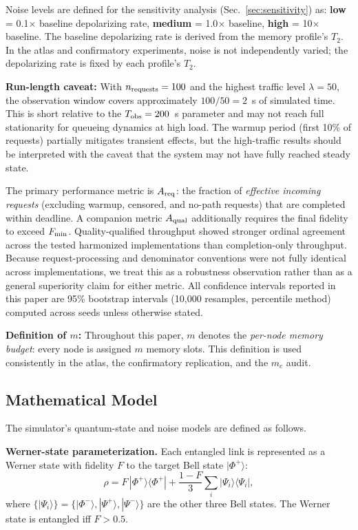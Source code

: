 \documentclass[quantumrep,article,submit,moreauthors]{Definitions/mdpi}
\begin{document}
Noise levels are defined for the sensitivity analysis (Sec.~\ref{sec:sensitivity}) as: \textbf{low} = 0.1$\times$ baseline depolarizing rate, \textbf{medium} = 1.0$\times$ baseline, \textbf{high} = 10$\times$ baseline. The baseline depolarizing rate is derived from the memory profile's $T_2$. In the atlas and confirmatory experiments, noise is not independently varied; the depolarizing rate is fixed by each profile's $T_2$.

\textbf{Run-length caveat:} With $n_{\rm requests} = 100$ and the highest traffic level $\lambda = 50$, the observation window covers approximately $100/50 = 2$~s of simulated time. This is short relative to the $T_{\rm obs} = 200$~s parameter and may not reach full stationarity for queueing dynamics at high load. The warmup period (first 10\% of requests) partially mitigates transient effects, but the high-traffic results should be interpreted with the caveat that the system may not have fully reached steady state.

The primary performance metric is $A_{\rm req}$: the fraction of \textit{effective incoming requests} (excluding warmup, censored, and no-path requests) that are completed within deadline. A companion metric $A_{\rm qual}$ additionally requires the final fidelity to exceed $F_{\rm min}$. Quality-qualified throughput showed stronger ordinal agreement across the tested harmonized implementations than completion-only throughput. Because request-processing and denominator conventions were not fully identical across implementations, we treat this as a robustness observation rather than as a general superiority claim for either metric. All confidence intervals reported in this paper are 95\% bootstrap intervals (10{,}000 resamples, percentile method) computed across seeds unless otherwise stated.

\textbf{Definition of $m$:} Throughout this paper, $m$ denotes the \textit{per-node memory budget}: every node is assigned $m$ memory slots. This definition is used consistently in the atlas, the confirmatory replication, and the $m_c$ audit.

\subsection{Mathematical Model}
\label{sec:math_model}

The simulator's quantum-state and noise models are defined as follows.

\textbf{Werner-state parameterization.} Each entangled link is represented as a Werner state with fidelity $F$ to the target Bell state $|\Phi^+\rangle$:
\begin{equation}
\rho = F\,|\Phi^+\rangle\langle\Phi^+| + \frac{1-F}{3}\sum_{i}|\Psi_i\rangle\langle\Psi_i|,
\end{equation}
where $\{|\Psi_i\rangle\} = \{|\Phi^-\rangle, |\Psi^+\rangle, |\Psi^-\rangle\}$ are the other three Bell states. The Werner state is entangled iff $F > 0.5$.
\end{document}
